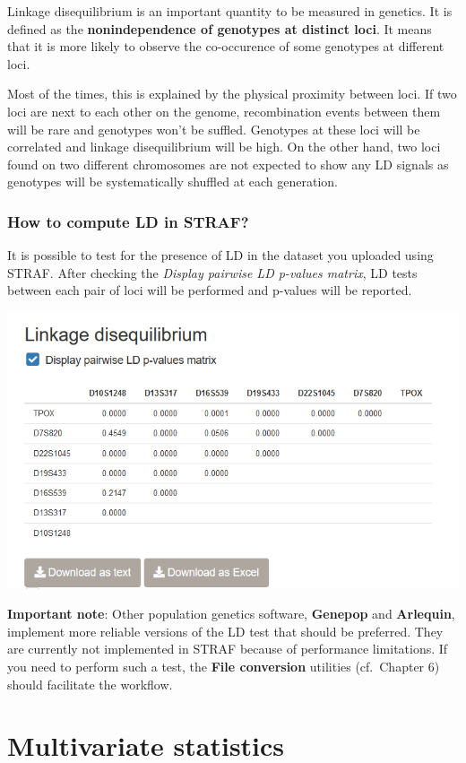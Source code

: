 \documentclass[
]{book}
\begin{document}
Linkage disequilibrium is an important quantity to be measured in genetics.
It is defined as the \textbf{nonindependence of genotypes at distinct loci}.
It means that it is more likely to observe the co-occurence of some genotypes
at different loci.

Most of the times, this is explained by the physical proximity between loci. If
two loci are next to each other on the genome, recombination events between them
will be rare and genotypes won't be suffled. Genotypes at these loci will be correlated
and linkage disequilibrium will be high. On the other hand, two loci found on two different
chromosomes are not expected to show any LD signals as genotypes will be systematically
shuffled at each generation.

\hypertarget{how-to-compute-ld-in-straf}{%
\subsection{How to compute LD in STRAF?}\label{how-to-compute-ld-in-straf}}

It is possible to test for the presence of LD in the dataset you uploaded using
STRAF. After checking the \emph{Display pairwise LD p-values matrix}, LD tests between
each pair of loci will be performed and p-values will be reported.

\includegraphics[width=0.8\linewidth]{img/capture_popgen_parameters_2}

\textbf{Important note}: Other population genetics software,
\textbf{Genepop} and \textbf{Arlequin}, implement more reliable
versions of the LD test that should be preferred. They are currently not implemented
in STRAF because of performance limitations. If you need to perform such a test, the
\textbf{File conversion} utilities (cf.~Chapter 6) should facilitate the workflow.

\hypertarget{multivariate-statistics}{%
\chapter{Multivariate statistics}\label{multivariate-statistics}}
\end{document}
